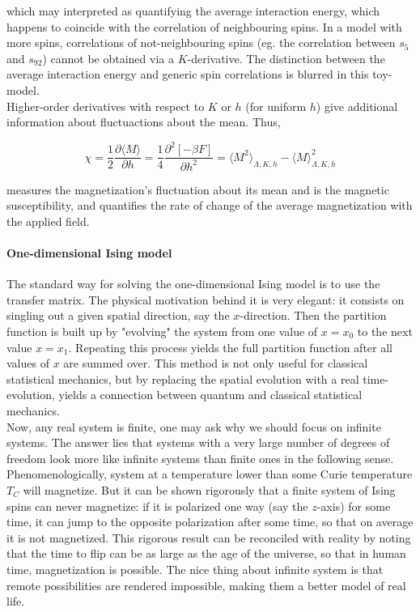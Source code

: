 \documentclass{homework}
\begin{document}
which may interpreted as quantifying the average interaction energy, which happens to coincide with the correlation of neighbouring spins. In a model with more spins, correlations of not-neighbouring spins (eg. the correlation between $s_5$ and $s_{92}$) cannot be obtained via a $K$-derivative. The distinction between the average interaction energy and generic spin correlations is blurred in this toy-model. \\

Higher-order derivatives with respect to $K$ or $h$ (for uniform $h$) give additional information about fluctuactions about the mean. Thus, 

\begin{equation}
    \chi = \frac{1}{2} \frac{ \partial \langle M \rangle}{\partial h} = \frac{1}{4} \frac{\partial^2 [-\beta F]}{\partial h^2} = \langle M^2 \rangle_{\Lambda, K, h}- \langle M \rangle^2_{\Lambda, K, h}
\end{equation}

measures the magnetization's fluctuation about its mean and is the magnetic susceptibility, and quantifies the rate of change of the average magnetization with the applied field. \\

\paragraph{\textbf{One-dimensional Ising model}}

The standard way for solving the one-dimensional Ising model is to use the transfer matrix. The physical motivation behind it is very elegant: it consists on singling out a given spatial direction, say the $x$-direction. Then the partition function is built up by "evolving" the system from one value of $x=x_0$ to the next value $x=x_1$. Repeating this process yields the full partition function after all values of $x$ are summed over. This method is not only useful for classical statistical mechanics, but by replacing the spatial evolution with a real time-evolution, yields a connection between quantum and classical statistical mechanics. \\

Now, any real system is finite, one may ask why we should focus on infinite systems. The answer lies that systems with a very large number of degrees of freedom look more like infinite systems than finite ones in the following sense.  Phenomenologically, system at a temperature lower than some Curie temperature $T_C$ will magnetize. But it can be shown rigorously that a finite system of Ising spins can never magnetize: if it is polarized one way (say the $z$-axis) for some time, it can jump to the opposite polarization after some time, so that on average it is not magnetized. This rigorous result can be reconciled with reality by noting that the time to flip can be as large as the age of the universe, so that in human time, magnetization is possible. The nice thing about infinite system is that remote possibilities are rendered impossible, making them a better model of real life. \\
\end{document}
